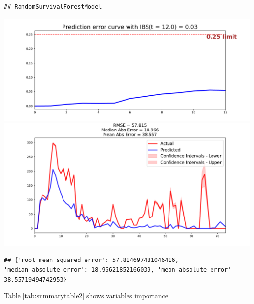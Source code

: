 \documentclass[
  12pt,
]{article}
\begin{document}
\begin{verbatim}
## RandomSurvivalForestModel
\end{verbatim}

\includegraphics{articleCustomerDropoutMembership_files/figure-latex/createModel-3.pdf} \includegraphics{articleCustomerDropoutMembership_files/figure-latex/createModel-4.pdf}

\begin{verbatim}
## {'root_mean_squared_error': 57.814697481046416, 'median_absolute_error': 18.96621852166039, 'mean_absolute_error': 38.55719494742953}
\end{verbatim}

Table \ref{tab:summarytable2} shows variables importance.
\end{document}
